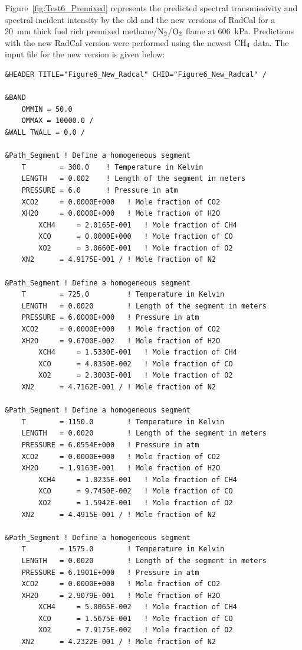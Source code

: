 Figure~\ref{fig:Test6_Premixed} represents the predicted spectral transmissivity and  spectral incident intensity by the old and the new versions of RadCal for a 20~mm thick fuel rich premixed methane/$\rm N_2$/$\rm O_2$ flame at 606~kPa. Predictions with the new RadCal version were performed using the newest $\rm CH_4$ data. The input file for the new version is given below:
\begin{lstlisting}
&HEADER TITLE="Figure6_New_Radcal" CHID="Figure6_New_Radcal" /

&BAND
	OMMIN = 50.0
	OMMAX = 10000.0 /
&WALL TWALL = 0.0 /

&Path_Segment ! Define a homogeneous segment
	T        = 300.0    ! Temperature in Kelvin
	LENGTH   = 0.002    ! Length of the segment in meters
	PRESSURE = 6.0      ! Pressure in atm
	XCO2     = 0.0000E+000   ! Mole fraction of CO2
	XH2O     = 0.0000E+000   ! Mole fraction of H2O
        XCH4     = 2.0165E-001   ! Mole fraction of CH4
        XCO      = 0.0000E+000   ! Mole fraction of CO
        XO2      = 3.0660E-001   ! Mole fraction of O2
	XN2      = 4.9175E-001 / ! Mole fraction of N2

&Path_Segment ! Define a homogeneous segment
	T        = 725.0         ! Temperature in Kelvin
	LENGTH   = 0.0020        ! Length of the segment in meters
	PRESSURE = 6.0000E+000   ! Pressure in atm
	XCO2     = 0.0000E+000   ! Mole fraction of CO2
	XH2O     = 9.6700E-002   ! Mole fraction of H2O
        XCH4     = 1.5330E-001   ! Mole fraction of CH4
        XCO      = 4.8350E-002   ! Mole fraction of CO
        XO2      = 2.3003E-001   ! Mole fraction of O2
	XN2      = 4.7162E-001 / ! Mole fraction of N2

&Path_Segment ! Define a homogeneous segment
	T        = 1150.0        ! Temperature in Kelvin
	LENGTH   = 0.0020        ! Length of the segment in meters
	PRESSURE = 6.0554E+000   ! Pressure in atm
	XCO2     = 0.0000E+000   ! Mole fraction of CO2
	XH2O     = 1.9163E-001   ! Mole fraction of H2O
        XCH4     = 1.0235E-001   ! Mole fraction of CH4
        XCO      = 9.7450E-002   ! Mole fraction of CO
        XO2      = 1.5942E-001   ! Mole fraction of O2
	XN2      = 4.4915E-001 / ! Mole fraction of N2

&Path_Segment ! Define a homogeneous segment
	T        = 1575.0        ! Temperature in Kelvin
	LENGTH   = 0.0020        ! Length of the segment in meters
	PRESSURE = 6.1901E+000   ! Pressure in atm
	XCO2     = 0.0000E+000   ! Mole fraction of CO2
	XH2O     = 2.9079E-001   ! Mole fraction of H2O
        XCH4     = 5.0065E-002   ! Mole fraction of CH4
        XCO      = 1.5675E-001   ! Mole fraction of CO
        XO2      = 7.9175E-002   ! Mole fraction of O2
	XN2      = 4.2322E-001 / ! Mole fraction of N2


\end{lstlisting}
